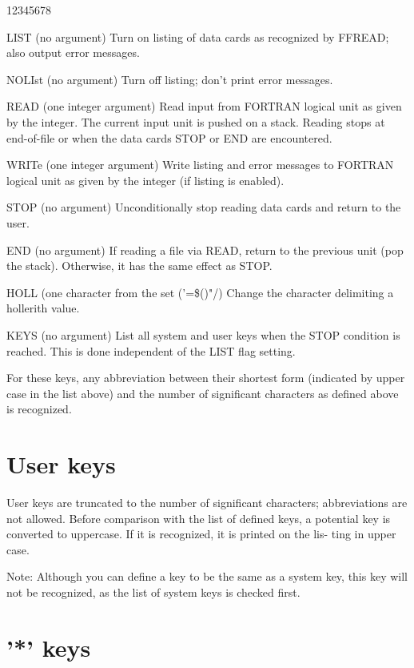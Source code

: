 \begin{DLtt}{12345678}
\item[LIST](no argument)
        Turn on listing of data cards as recognized by FFREAD; also output
        error messages.
\item[NOLIst](no argument)
        Turn off listing; don't print error messages.
\item[READ](one integer argument)
        Read input from FORTRAN logical unit as given by the integer.
        The current input unit is pushed on a stack. Reading stops at
        end-of-file or when the data cards STOP or END are encountered.
\item[WRITe](one integer argument)
        Write listing and error messages to FORTRAN logical unit as given by
        the integer (if listing is enabled).
\item[STOP](no argument)
        Unconditionally stop reading data cards and return to the user.
\item[END](no argument)
        If reading a file via READ, return to the previous unit (pop the stack).
        Otherwise, it has the same effect as STOP.
\item[HOLL](one character from the set ('=\$()"/)
        Change the character delimiting a hollerith value.
\item[KEYS](no argument)
        List all system and user keys when the STOP condition is reached.
        This is done independent of the LIST flag setting.
\end{DLtt}
 
For these keys, any abbreviation between their shortest form (indicated by
upper case in the list above) and the number of significant characters as
defined above is recognized.
 
\section{User keys}

User keys are truncated to the number of significant characters; abbreviations
are not allowed. Before comparison with the list of defined keys, a potential
key is converted to uppercase. If it is recognized, it is printed on the lis-
ting in upper case.
 
Note: Although you can define a key to be the same as a system key, this key
      will not be recognized, as the list of system keys is checked first.
 
\section{'*' keys}
 
